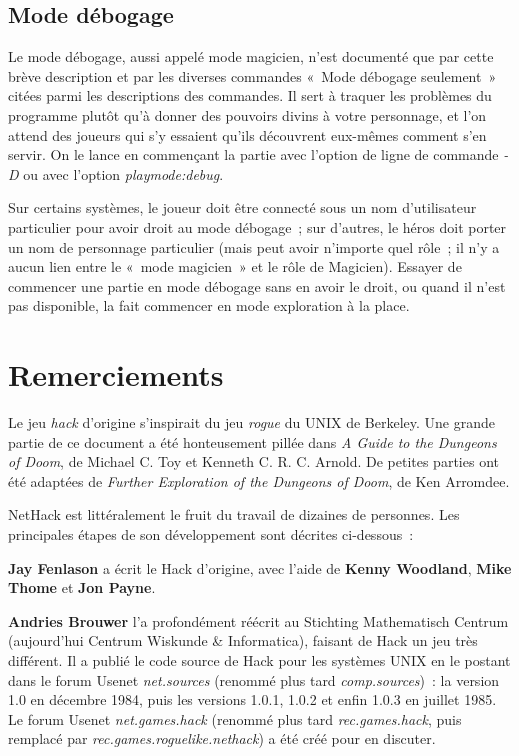 \documentclass[titlepage]{article}
\begin{document}
\subsection{Mode débogage}



Le mode débogage, aussi appelé mode magicien, n'est documenté que par
cette brève description et par les diverses commandes «~Mode débogage
seulement~» citées parmi les descriptions des commandes.
Il sert à traquer les problèmes du programme plutôt qu'à donner des
pouvoirs divins à votre personnage, et l'on attend des joueurs qui s'y
essaient qu'ils découvrent eux-mêmes comment s'en servir.
On le lance en commençant la partie avec l'option de ligne de commande
\textit{-D}
ou avec l'option
\textit{playmode:debug}.


Sur certains systèmes, le joueur doit être connecté sous un nom
d'utilisateur particulier pour avoir droit au mode débogage~; sur
d'autres, le héros doit porter un nom de personnage particulier (mais peut
avoir n'importe quel rôle~; il n'y a aucun lien entre le «~mode
magicien~» et le rôle de Magicien).
Essayer de commencer une partie en mode débogage sans en avoir le droit,
ou quand il n'est pas disponible, la fait commencer en mode exploration à
la place.

\section*{Remerciements}



Le jeu \textit{hack} d'origine s'inspirait du jeu \textit{rogue} du
UNIX de Berkeley.
Une grande partie de ce document a été honteusement pillée dans \textit{A Guide
to the Dungeons of Doom}, de Michael C. Toy et Kenneth C. R. C. Arnold.
De petites parties ont été adaptées de \textit{Further Exploration of the
Dungeons of Doom}, de Ken Arromdee.


NetHack est littéralement le fruit du travail de dizaines de personnes.
Les principales étapes de son développement sont décrites ci-dessous~:


\textbf{Jay Fenlason} a écrit le Hack d'origine, avec l'aide de \textbf{Kenny
Woodland}, \textbf{Mike Thome} et \textbf{Jon Payne}.


\textbf{Andries Brouwer} l'a profondément réécrit au Stichting Mathematisch
Centrum (aujourd'hui Centrum Wiskunde \& Informatica), faisant de Hack un
jeu très différent.
Il a publié le code source de Hack pour les systèmes
UNIX
en le postant dans le forum Usenet \textit{net.sources} (renommé plus tard
\textit{comp.sources})~: la version 1.0 en décembre 1984, puis les versions
1.0.1, 1.0.2 et enfin 1.0.3 en juillet 1985.
Le forum Usenet \textit{net.games.hack} (renommé plus tard
\textit{rec.games.hack}, puis remplacé par \textit{rec.games.roguelike.nethack})
a été créé pour en discuter.
\end{document}
